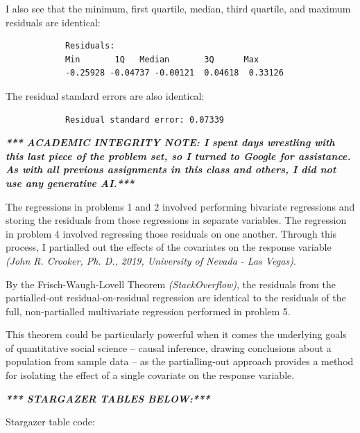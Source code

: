 \documentclass[12pt,letterpaper]{article}
\begin{document}
\begin{enumerate}
		\vspace{.5cm}	I also see that the minimum, first quartile, median, third quartile, and maximum residuals are identical:
		
		\begin{verbatim}
			Residuals:
			Min       1Q   Median       3Q      Max 
			-0.25928 -0.04737 -0.00121  0.04618  0.33126 
		\end{verbatim}
		
		The residual standard errors are also identical:
		
		\begin{verbatim}
			Residual standard error: 0.07339 
		\end{verbatim}
		
		
		\textit{\textbf{*** ACADEMIC INTEGRITY NOTE: I spent days wrestling with this last piece of the problem set, so I turned to Google for assistance. As with all previous assignments in this class and others, I did not use any generative AI.***}}
		
		The regressions in problems 1 and 2 involved performing bivariate regressions and storing the residuals from those regressions in separate variables. The regression in problem 4 involved regressing those residuals on one another. Through this process, I partialled out the effects of the covariates on the response variable \textit{(John R. Crooker, Ph. D., 2019, University of Nevada - Las Vegas)}.
		
		By the Frisch-Waugh-Lovell Theorem \textit{(StackOverflow)}, the residuals from the partialled-out residual-on-residual regression are identical to the residuals of the full, non-partialled multivariate regression performed in problem 5. 
		
		This theorem could be particularly powerful when it comes the underlying goals of quantitative social science -- causal inference, drawing conclusions about a population from sample data -- as the partialling-out approach provides a method for isolating the effect of a single covariate on the response variable. 

		
	\end{enumerate}

\vspace{1cm}

\textit{\textbf{*** STARGAZER TABLES BELOW:***}}

\vspace{1cm}

Stargazer table code:


\end{document}
